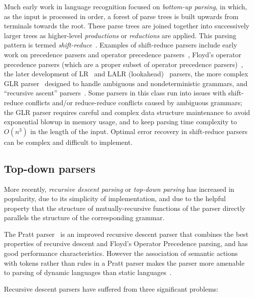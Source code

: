 \documentclass[manuscript,screen]{acmart}
\begin{document}
Much early work in language recognition focused on \emph{bottom-up parsing}, in which, as the input is processed in order, a forest of parse trees is built upwards from terminals towards the root. These parse trees are joined together into successively larger trees as higher-level \emph{productions} or \emph{reductions} are applied. This parsing pattern is termed \emph{shift-reduce}~\citep{aho2006}. Examples of shift-reduce parsers include early work on precedence parsers and operator precedence parsers~\citep{samelson1960,knuth1962,gray1969,aho1975,aho1977}, Floyd's operator precedence parsers (which are a proper subset of operator precedence parsers)~\citep{floyd1963,ruvzivcka1979}, the later development of LR~\citep{knuth1965} and LALR (lookahead)~\citep{deremer1969} parsers, the more complex GLR parser~\citep{lang1974} designed to handle ambiguous and nondeterministic grammars, and ``recursive ascent'' parsers~\citep{thomas1986}. Some parsers in this class run into issues with shift-reduce conflicts and/or reduce-reduce conflicts caused by ambiguous grammars; the GLR parser requires careful and complex data structure maintenance to avoid exponential blowup in memory usage, and to keep parsing time complexity to $O(n^3)$ in the length of the input. Optimal error recovery in shift-reduce parsers can be complex and difficult to implement.

\subsection{Top-down parsers}

More recently, \emph{recursive descent parsing} or \emph{top-down parsing} has increased in popularity, due to its simplicity of implementation, and due to the helpful property that the structure of mutually-recursive functions of the parser directly parallels the structure of the corresponding grammar.

The Pratt parser~\citep{pratt1973,crockford2007} is an improved recursive descent parser that combines the best properties of recursive descent and Floyd's Operator Precedence parsing, and has good performance characteristics. However the association of semantic actions with tokens rather than rules in a Pratt parser makes the parser more amenable to parsing of dynamic languages than static languages~\citep{crockford2007}.

Recursive descent parsers have suffered from three significant problems:
\end{document}

